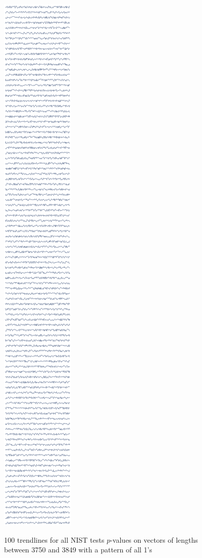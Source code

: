\documentclass[oneside,12pt]{amsart}
\theoremstyle{definition}
\numberwithin{equation}{section}
\begin{document}
\begin{figure}[h!]
\centering
\caption{100 trendlines for all NIST tests $p$-values on vectors of lengths between 3750 and 3849 with a pattern of all 1's}
\includegraphics[width=0.2\linewidth, height=1.2\linewidth]{./charts/varying-lengths-v2-alt.png}
\label{fig:lengths}
\end{figure}
\end{document}
